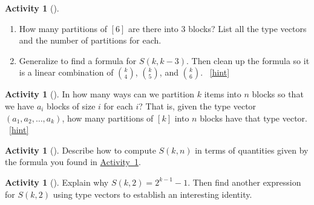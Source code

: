 \documentclass[10pt,]{book}
\theoremstyle{plain}
\theoremstyle{definition}
\theoremstyle{definition}
\theoremstyle{definition}
\newtheorem{activity}[project]{Activity}
\numberwithin{equation}{chapter}
\begin{document}
\begin{activity}[]\label{activity-213}
\leavevmode%
\begin{enumerate}[font=\bfseries,label=(\alph*),ref=\alph*]
\item\label{task-190} \hypertarget{p-1000}{}%
How many partitions of \([6]\) are there into 3 blocks?  List all the type vectors and the number of partitions for each.%
\item\label{task-191} \hypertarget{p-1001}{}%
Generalize to find a formula for \(S(k,k-3)\).  Then clean up the formula so it is a linear combination of \(\binom{k}{4}\), \(\binom{k}{5}\), and \(\binom{k}{6}\).%
~\hfill{\tiny\hyperlink{a-213.b}{[hint]}\hypertarget{q-213.b}{}}\end{enumerate}
\end{activity}
\begin{activity}[]\label{partitionsgivenpartsize}
\hypertarget{p-1003}{}%
In how many ways can we partition \(k\) items into \(n\) blocks so that we have \(a_i\) blocks of size \(i\) for each \(i\)? That is, given the type vector \((a_1, a_2, \ldots, a_k)\), how many partitions of \([k]\) into \(n\) blocks have that type vector.%
~\hfill{\tiny\hyperlink{a-214}{[hint]}\hypertarget{q-214}{}}\end{activity}
\begin{activity}[]\label{activity-215}
\hypertarget{p-1006}{}%
Describe how to compute \(S(k,n)\) in terms of quantities given by the formula you found in \hyperref[partitionsgivenpartsize]{Activity~\ref{partitionsgivenpartsize}}.%
\end{activity}
\begin{activity}[]\label{activity-216}
\hypertarget{p-1008}{}%
Explain why \(S(k, 2) = 2^{k-1} - 1\).  Then find another expression for \(S(k,2)\) using type vectors to establish an interesting identity.%
\end{activity}
\typeout{************************************************}
\typeout{************************************************}
\end{document}
